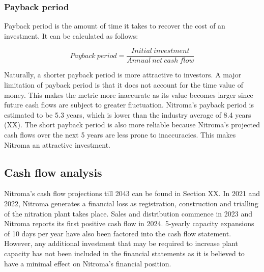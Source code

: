 

\subsubsection{Payback period}
\label{sec:pby}
Payback period is the amount of time it takes to recover the cost of an investment. It can be calculated as follows:

\begin{equation}
\label{eqn:payback}
    Payback\:period = \frac{Initial\:investment}{Annual\:net\:cash\:flow}
\end{equation}

Naturally, a shorter payback period is more attractive to investors. A major limitation of payback period is that it does not account for the time value of money. This makes the metric more inaccurate as its value becomes larger since future cash flows are subject to greater fluctuation. Nitroma’s payback period is estimated to be 5.3 years, which is lower than the industry average of 8.4 years (XX).  The short payback period is also more reliable because Nitroma’s projected cash flows over the next 5 years are less prone to inaccuracies. This makes Nitroma an attractive investment. 


\subsection{Cash flow analysis}
\label{sec:cash-flows}
Nitroma’s cash flow projections till 2043 can be found in Section XX. In 2021 and 2022, Nitroma generates a financial loss as registration, construction and trialling of the nitration plant takes place. Sales and distribution commence in 2023 and Nitroma reports its first positive cash flow in 2024. 5-yearly capacity expansions of 10 days per year have also been factored into the cash flow statement. However, any additional investment that may be required to increase plant capacity has not been included in the financial statements as it is believed to have a minimal effect on Nitroma’s financial position.

